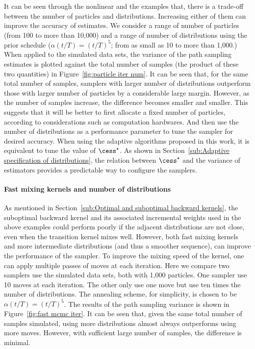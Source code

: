 It can be seen through the nonlinear \ode and the \pet examples that, there is
a trade-off between the number of particles and distributions. Increasing
either of them can improve the accuracy of estimates. We consider a range of
number of particles (from 100 to more than 10,000) and a range of number of
distributions using the prior schedule ($\alpha(t/T) = (t/T)^5$; from as small
as 10 to more than 1,000.) When applied to the simulated data sets, the
variance of the path sampling estimates is plotted against the total number of
samples (the product of these two quantities) in Figure~\ref{fig:particle iter
  num}. It can be seen that, for the same total number of samples, samplers
with larger number of distributions outperform those with larger number of
particles by a considerable large margin. However, as the number of samples
increase, the difference becomes smaller and smaller. This suggests that it
will be better to first allocate a fixed number of particles, according to
considerations such as computation hardwares. And then use the number of
distributions as a performance parameter to tune the sampler for desired
accuracy. When using the adaptive algorithms proposed in this work, it is
equivalent to tune the value of $\cess^\star$. As shown in
Section~\ref{sub:Adaptive specification of distributions}, the relation
between $\cess^\star$ and the variance of estimators provides a predictable
way to configure the samplers.

\paragraph{Fast mixing \mcmc kernels and number of distributions}

As mentioned in Section~\ref{sub:Optimal and suboptimal backward kernels}, the
suboptimal backward kernel and its associated incremental weights used in the
above examples could perform poorly if the adjacent distributions are not
close, even when the transition kernel mixes well. However, both fast mixing
kernels and more intermediate distributions (and thus a smoother sequence),
can improve the performance of the sampler. To improve the mixing speed of the
kernel, one can apply multiple passes of \mcmc moves at each iteration. Here
we compare two samplers use the simulated data sets, both with 1,000 particles.
One sampler use 10 \mcmc moves at each iteration. The other only use one \mcmc
move but use ten times the number of distributions. The annealing scheme, for
simplicity, is chosen to be $\alpha(t/T) = (t/T)^5$. The results of the path
sampling variance is shown in Figure~\ref{fig:fast mcmc iter}. It can be seen
that, given the same total number of samples simulated, using more
distributions almost always outperforms using more \mcmc moves. However, with
sufficient large number of samples, the difference is minimal.

